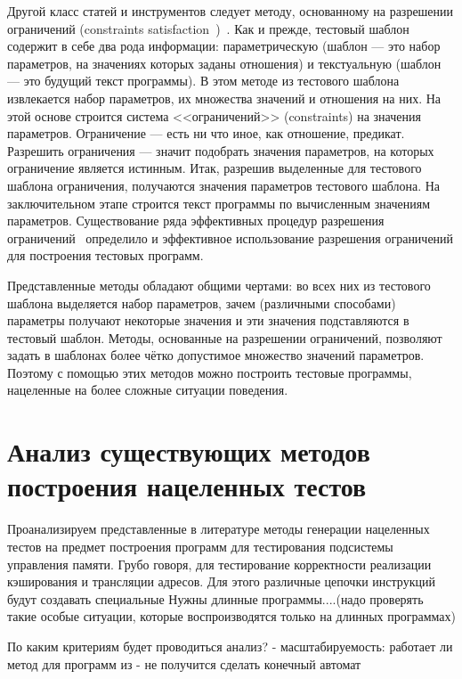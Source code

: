 \documentclass[14pt]{extreport}
\begin{document}
Другой класс статей и инструментов следует методу, основанному на разрешении ограничений (constraints satisfaction~\cite{CLP})~\cite{GenesysPro, GenesysPro2004Innovations, DeepTrans, RAVEN, MAATG}. Как и прежде, тестовый шаблон содержит в себе два рода информации: параметрическую (шаблон --- это набор параметров, на значениях которых заданы отношения) и текстуальную (шаблон --- это будущий текст программы). В этом методе из тестового шаблона извлекается набор параметров, их множества значений и отношения на них. На этой основе строится система <<ограничений>> (constraints) на значения параметров. Ограничение --- есть ни что иное, как отношение, предикат. Разрешить ограничения --- значит подобрать значения параметров, на которых ограничение является истинным. Итак, разрешив выделенные для тестового шаблона ограничения, получаются значения параметров тестового шаблона. На заключительном этапе строится текст программы по вычисленным значениям параметров. Существование ряда эффективных процедур разрешения ограничений~\cite{CLP, SMT} определило и эффективное использование разрешения ограничений для построения тестовых программ.

Представленные методы обладают общими чертами: во всех них из тестового шаблона выделяется набор параметров, зачем (различными способами) параметры получают некоторые значения и эти значения подставляются в тестовый шаблон. Методы, основанные на разрешении ограничений, позволяют задать в шаблонах более чётко допустимое множество значений параметров. Поэтому с помощью этих методов можно построить тестовые программы, нацеленные на более сложные ситуации поведения.

\section{Анализ существующих методов построения нацеленных тестов}

Проанализируем представленные в литературе методы генерации нацеленных тестов на предмет построения программ для тестирования подсистемы управления памяти. Грубо говоря, для тестирование корректности реализации кэширования и трансляции адресов. Для этого различные цепочки инструкций будут создавать специальные  Нужны длинные программы....(надо проверять такие особые ситуации, которые воспроизводятся только на длинных программах)

По каким критериям будет проводиться анализ?
- масштабируемость: работает ли метод для программ из 
- не получится сделать конечный автомат
\end{document}
